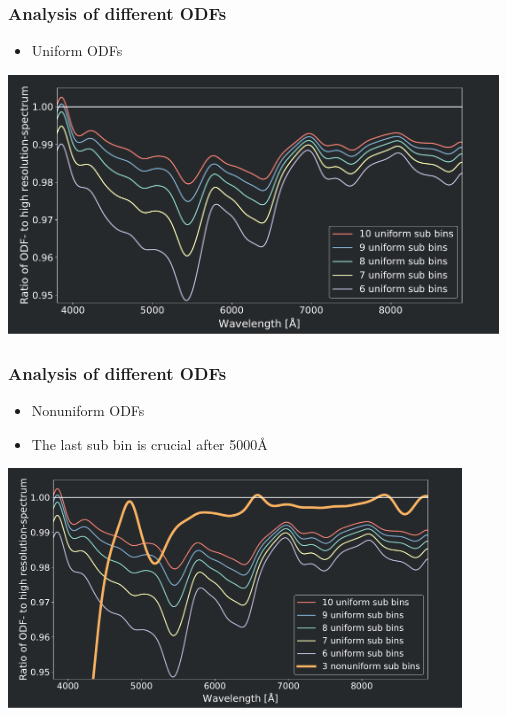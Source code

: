 \frame
{
	\frametitle{Analysis of different ODFs}
	\begin{itemize}
	\item Uniform ODFs
	\end{itemize}
	
	\centering
	\includegraphics[width=130mm]{images/6_10_vs_best_4_0}
}
\frame
{
	\frametitle{Analysis of different ODFs}
	\begin{itemize}
		\item Nonuniform ODFs
		\item The last sub bin is crucial after 5000\si{\angstrom}
    \end{itemize}	  
	\centering
	\includegraphics[width=120mm]{images/6_10_vs_best_4_1}
}
\frame
